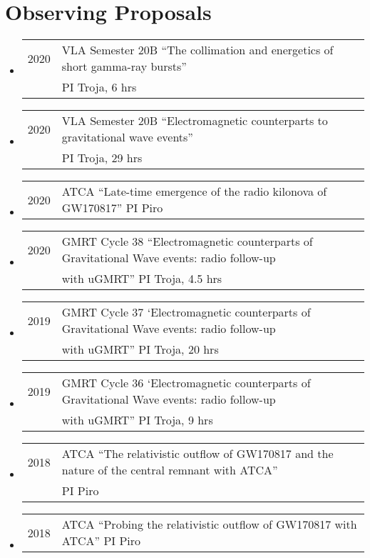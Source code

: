 \section*{Observing Proposals}
\begin{itemize}
\item \begin{tabular}{ll}
2020	& VLA Semester 20B ``The collimation and energetics of short gamma-ray bursts''\\
	&  PI Troja, 6 hrs
\end{tabular}
\item \begin{tabular}{ll}
2020	& VLA Semester 20B ``Electromagnetic counterparts to gravitational wave events''\\
	&  PI Troja, 29 hrs
\end{tabular}
\item \begin{tabular}{ll}
2020	& ATCA ``Late-time emergence of the radio kilonova of GW170817'' PI Piro
\end{tabular}
\item \begin{tabular}{ll}
2020	& GMRT Cycle 38 ``Electromagnetic counterparts of Gravitational Wave events: radio follow-up\\
	&  with uGMRT'' PI Troja, 4.5 hrs
\end{tabular}
\item \begin{tabular}{ll}
2019	& GMRT Cycle 37 `Electromagnetic counterparts of Gravitational Wave events: radio follow-up\\
	&  with uGMRT'' PI Troja, 20 hrs
\end{tabular}
\item \begin{tabular}{ll}
2019	& GMRT Cycle 36 `Electromagnetic counterparts of Gravitational Wave events: radio follow-up\\
	&  with uGMRT'' PI Troja, 9 hrs
\end{tabular}
\item \begin{tabular}{ll}
2018	& ATCA ``The relativistic outflow of GW170817 and the nature of the central remnant with ATCA''\\
	&  PI Piro
\end{tabular}
\item \begin{tabular}{ll}
2018	& ATCA ``Probing the relativistic outflow of GW170817 with ATCA'' PI Piro

\end{tabular}
\end{itemize}
